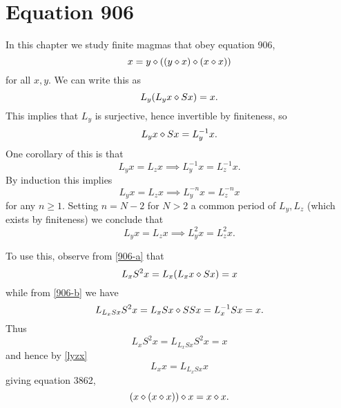 \chapter{Equation 906}\label{906-chapter}

In this chapter we study finite magmas that obey equation 906,
\begin{equation}\label{906}
  x = y \diamond ((y \diamond x) \diamond (x \diamond x))
\end{equation}
for all $x,y$.  We can write this as
\begin{equation}\label{906-a}
  L_y (L_y x \diamond Sx) = x.
\end{equation}
This implies that $L_y$ is surjective, hence invertible by finiteness, so
\begin{equation}\label{906-b}
   L_y x \diamond Sx = L_y^{-1} x.
\end{equation}
One corollary of this is that
$$ L_y x = L_z x \implies L_y^{-1} x = L_z^{-1} x.$$
By induction this implies
$$ L_y x = L_z x \implies L_y^{-n} x = L_z^{-n} x$$
for any $n \geq 1$.  Setting $n = N-2$ for $N>2$ a common period of $L_y,L_z$ (which exists by finiteness) we conclude that
\begin{equation}\label{lyzx}
  L_y x = L_z x \implies L_y^2 x = L_z^2 x.
\end{equation}

To use this, observe from \eqref{906-a} that
$$ L_x S^2 x = L_x (L_x x \diamond Sx) = x$$
while from \eqref{906-b} we have
$$ L_{L_x Sx} S^2 x = L_x Sx \diamond S S x = L_x^{-1} Sx = x.$$
Thus
$$ L_x S^2 x = L_{L_x Sx} S^2 x = x$$
and hence by \eqref{lyzx}
$$ L_x x = L_{L_x Sx} x$$
giving equation 3862,
\begin{equation}\label{3862}
  (x \diamond (x \diamond x)) \diamond x = x \diamond x.
\end{equation}
